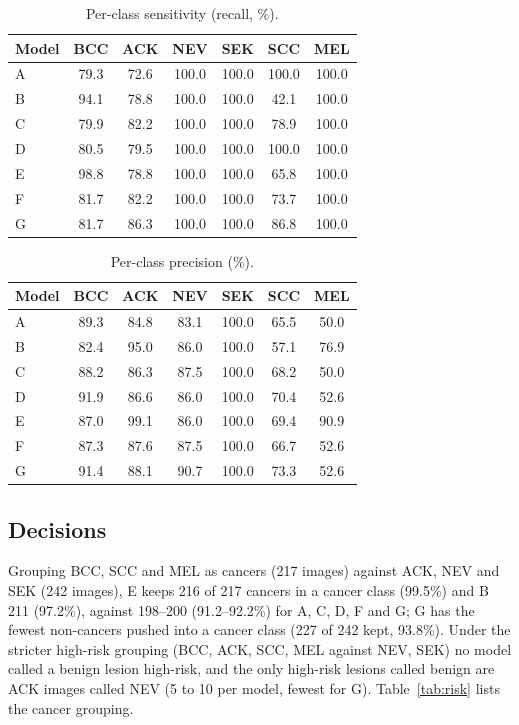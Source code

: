 \documentclass[conference]{IEEEtran}
\begin{document}
\begin{table}[!t]
\caption{Per-class sensitivity (recall, \%).}
\label{tab:rec}
\centering\scriptsize\setlength{\tabcolsep}{3pt}
\begin{tabular}{lcccccc}
\toprule
Model & BCC & ACK & NEV & SEK & SCC & MEL \\
\midrule
A & 79.3 & 72.6 & 100.0 & 100.0 & 100.0 & 100.0 \\
B & 94.1 & 78.8 & 100.0 & 100.0 & 42.1 & 100.0 \\
C & 79.9 & 82.2 & 100.0 & 100.0 & 78.9 & 100.0 \\
D & 80.5 & 79.5 & 100.0 & 100.0 & 100.0 & 100.0 \\
E & 98.8 & 78.8 & 100.0 & 100.0 & 65.8 & 100.0 \\
F & 81.7 & 82.2 & 100.0 & 100.0 & 73.7 & 100.0 \\
G & 81.7 & 86.3 & 100.0 & 100.0 & 86.8 & 100.0 \\
\bottomrule
\end{tabular}
\end{table}

\begin{table}[!t]
\caption{Per-class precision (\%).}
\label{tab:prec}
\centering\scriptsize\setlength{\tabcolsep}{3pt}
\begin{tabular}{lcccccc}
\toprule
Model & BCC & ACK & NEV & SEK & SCC & MEL \\
\midrule
A & 89.3 & 84.8 & 83.1 & 100.0 & 65.5 & 50.0 \\
B & 82.4 & 95.0 & 86.0 & 100.0 & 57.1 & 76.9 \\
C & 88.2 & 86.3 & 87.5 & 100.0 & 68.2 & 50.0 \\
D & 91.9 & 86.6 & 86.0 & 100.0 & 70.4 & 52.6 \\
E & 87.0 & 99.1 & 86.0 & 100.0 & 69.4 & 90.9 \\
F & 87.3 & 87.6 & 87.5 & 100.0 & 66.7 & 52.6 \\
G & 91.4 & 88.1 & 90.7 & 100.0 & 73.3 & 52.6 \\
\bottomrule
\end{tabular}
\end{table}


\subsection{Decisions}
Grouping BCC, SCC and MEL as cancers (217 images) against ACK, NEV and SEK (242 images), E keeps 216 of 217 cancers in a cancer class (99.5\%) and B 211 (97.2\%), against 198--200 (91.2--92.2\%) for A, C, D, F and G; G has the fewest non-cancers pushed into a cancer class (227 of 242 kept, 93.8\%). Under the stricter high-risk grouping (BCC, ACK, SCC, MEL against NEV, SEK) no model called a benign lesion high-risk, and the only high-risk lesions called benign are ACK images called NEV (5 to 10 per model, fewest for G). Table~\ref{tab:risk} lists the cancer grouping.
\end{document}

